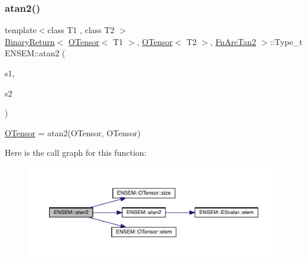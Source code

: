\subsubsection{\texorpdfstring{atan2()}{atan2()}\hspace{0.1cm}{\footnotesize\ttfamily [1/3]}}
{\footnotesize\ttfamily template$<$class T1 , class T2 $>$ \\
\mbox{\hyperlink{structENSEM_1_1BinaryReturn}{Binary\+Return}}$<$ \mbox{\hyperlink{classENSEM_1_1OTensor}{O\+Tensor}}$<$ T1 $>$, \mbox{\hyperlink{classENSEM_1_1OTensor}{O\+Tensor}}$<$ T2 $>$, \mbox{\hyperlink{structENSEM_1_1FnArcTan2}{Fn\+Arc\+Tan2}} $>$\+::Type\+\_\+t E\+N\+S\+E\+M\+::atan2 (\begin{DoxyParamCaption}\item[{const \mbox{\hyperlink{classENSEM_1_1OTensor}{O\+Tensor}}$<$ T1 $>$ \&}]{s1,  }\item[{const \mbox{\hyperlink{classENSEM_1_1OTensor}{O\+Tensor}}$<$ T2 $>$ \&}]{s2 }\end{DoxyParamCaption})\hspace{0.3cm}{\ttfamily [inline]}}



\mbox{\hyperlink{classENSEM_1_1OTensor}{O\+Tensor}} = atan2(\+O\+Tensor, O\+Tensor) 

Here is the call graph for this function\+:\nopagebreak
\begin{figure}[H]
\begin{center}
\leavevmode
\includegraphics[width=350pt]{de/d87/group__obstensor_ga167556ae7bebc48d05e83003206f36dd_cgraph}
\end{center}
\end{figure}
\mbox{\label{group__obstensor_gaba8ed2c3683bbcbda35e8a372d7ee2e6}} 
